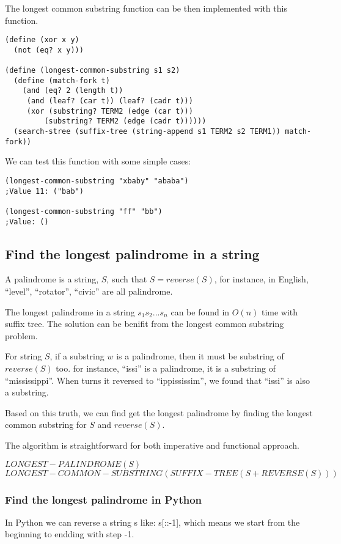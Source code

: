 \documentclass{article}
\begin{document}
The longest common substring function can be then implemented with
this function.

\begin{lstlisting}
(define (xor x y)
  (not (eq? x y)))

(define (longest-common-substring s1 s2)
  (define (match-fork t)
    (and (eq? 2 (length t)) 
	 (and (leaf? (car t)) (leaf? (cadr t)))
	 (xor (substring? TERM2 (edge (car t)))
	     (substring? TERM2 (edge (cadr t))))))
  (search-stree (suffix-tree (string-append s1 TERM2 s2 TERM1)) match-fork))
\end{lstlisting}

We can test this function with some simple cases:

\begin{lstlisting}
(longest-common-substring "xbaby" "ababa")
;Value 11: ("bab")

(longest-common-substring "ff" "bb")
;Value: ()
\end{lstlisting}

\subsection{Find the longest palindrome in a string}
A palindrome is a string, $S$, such that $S=reverse(S)$, for instance,
in English, ``level'', ``rotator'', ``civic'' are all palindrome.

The longest palindrome in a string $s_1s_2...s_n$ can be found in 
$O(n)$ time with suffix tree. The solution can be benifit from the 
longest common substring problem.

For string $S$, if a substring $w$ is a palindrome, then it must be
substring of $reverse(S)$ too. for instance, ``issi'' is a palindrome,
it is a substring of ``mississippi''. When turns it reversed to
``ippississim'', we found that ``issi'' is also a substring.

Based on this truth, we can find get the longest palindrome by
finding the longest common substring for $S$ and $reverse(S)$.

The algorithm is straightforward for both imperative and functional
approach.

\begin{algorithmic}
\STATE $LONGEST-PALINDROME(S)$
  \RETURN $LONGEST-COMMON-SUBSTRING(SUFFIX-TREE(S+REVERSE(S)))$
\end{algorithmic}

\subsubsection*{Find the longest palindrome in Python}
In Python we can reverse a string s like: s[::-1], which means
we start from the beginning to endding with step -1.
\end{document}
